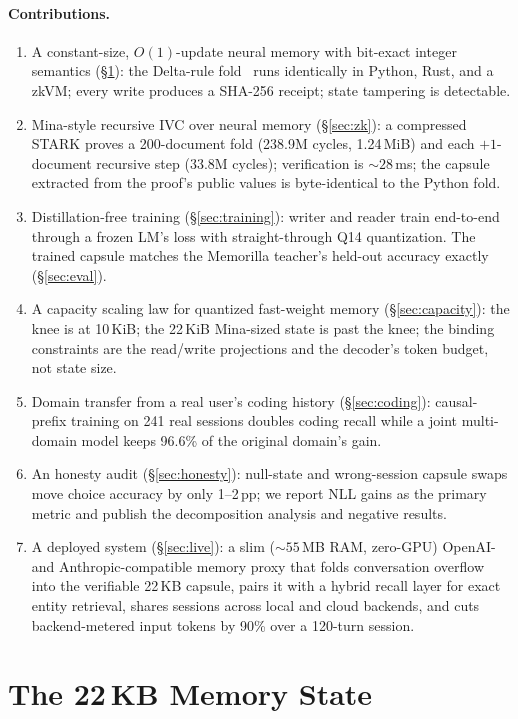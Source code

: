 \documentclass[11pt]{article}
\begin{document}
\paragraph{Contributions.}
\begin{enumerate}
\item A constant-size, $O(1)$-update neural memory with bit-exact
integer semantics (\S\ref{sec:state}): the Delta-rule
fold~\cite{schlag2021fast,yang2024delta} runs identically in Python, Rust, and a
zkVM; every write produces a SHA-256 receipt; state tampering is
detectable.
\item Mina-style recursive IVC over neural memory
(\S\ref{sec:zk}): a compressed STARK proves a 200-document fold
(238.9M cycles, 1.24\,MiB) and each $+1$-document recursive step
(33.8M cycles); verification is ${\sim}28$\,ms; the capsule extracted
from the proof's public values is byte-identical to the Python fold.
\item Distillation-free training (\S\ref{sec:training}): writer and
reader train end-to-end through a frozen LM's loss with
straight-through Q14 quantization. The trained capsule matches the
Memorilla teacher's held-out accuracy exactly (\S\ref{sec:eval}).
\item A capacity scaling law for quantized fast-weight memory
(\S\ref{sec:capacity}): the knee is at 10\,KiB; the 22\,KiB Mina-sized
state is past the knee; the binding constraints are the read/write
projections and the decoder's token budget, not state size.
\item Domain transfer from a real user's coding history
(\S\ref{sec:coding}): causal-prefix training on 241 real sessions
doubles coding recall while a joint multi-domain model keeps 96.6\% of
the original domain's gain.
\item An honesty audit (\S\ref{sec:honesty}): null-state and
wrong-session capsule swaps move choice accuracy by only 1--2\,pp; we
report NLL gains as the primary metric and publish the decomposition
analysis and negative results.
\item A deployed system (\S\ref{sec:live}): a slim (${\sim}55$\,MB RAM,
zero-GPU) OpenAI- and Anthropic-compatible memory proxy that folds
conversation overflow into the verifiable 22\,KB capsule, pairs it with a
hybrid recall layer for exact entity retrieval, shares sessions across
local and cloud backends, and cuts backend-metered input tokens by 90\%
over a 120-turn session.
\end{enumerate}

\section{The 22\,KB Memory State}
\label{sec:state}
\end{document}
